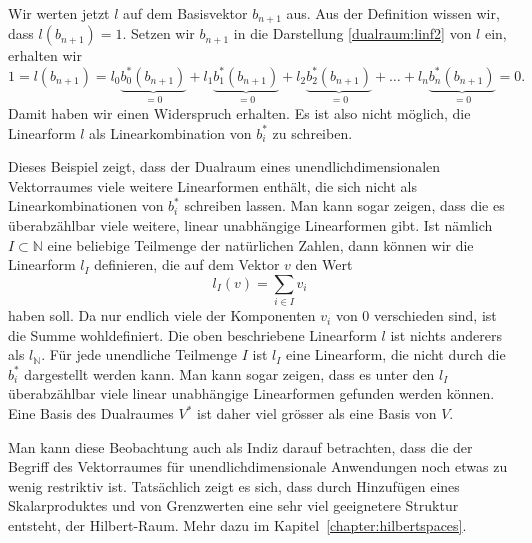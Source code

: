 Wir werten jetzt $l$ auf dem Basisvektor $b_{n+1}$ aus.
Aus der Definition wissen wir, dass $l(b_{n+1})=1$.
Setzen wir $b_{n+1}$ in die Darstellung 
\eqref{dualraum:linf2} von $l$ ein, erhalten wir
\[
1
=
l(b_{n+1})
=
l_0\underbrace{b_0^*(b_{n+1})}_{\displaystyle=0}
+
l_1\underbrace{b_1^*(b_{n+1})}_{\displaystyle=0}
+
l_2\underbrace{b_2^*(b_{n+1})}_{\displaystyle=0}
+\dots+
l_n\underbrace{b_n^*(b_{n+1})}_{\displaystyle=0}
=
0.
\]
Damit haben wir einen Widerspruch erhalten.
Es ist also nicht möglich, die Linearform $l$ als Linearkombination
von $b_i^*$ zu schreiben.

Dieses Beispiel zeigt, dass der Dualraum eines unendlichdimensionalen
Vektorraumes viele weitere Linearformen enthält, die sich nicht
als Linearkombinationen von $b_i^*$ schreiben lassen.
Man kann sogar zeigen, dass die es überabzählbar viele weitere, linear
unabhängige Linearformen gibt.
Ist nämlich $I\subset\mathbb N$ eine beliebige Teilmenge der natürlichen
Zahlen, dann können wir die Linearform $l_I$ definieren, die auf dem
Vektor $v$ den Wert
\[
l_I(v) = \sum_{i\in I}v_i
\]
haben soll.
Da nur endlich viele der Komponenten $v_i$ von $0$ verschieden sind, 
ist die Summe wohldefiniert.
Die oben beschriebene Linearform $l$ ist nichts anderers als $l_{\mathbb N}$.
Für jede unendliche Teilmenge $I$ ist $l_I$ eine Linearform, die nicht
durch die $b_i^*$ dargestellt werden kann.
Man kann sogar zeigen, dass es unter den $l_I$ überabzählbar viele 
linear unabhängige Linearformen gefunden werden können.
Eine Basis des Dualraumes $V^*$ ist daher viel grösser als eine Basis
von $V$.

Man kann diese Beobachtung auch als Indiz darauf betrachten, dass die
der Begriff des Vektorraumes für unendlichdimensionale Anwendungen noch
etwas zu wenig restriktiv ist.
Tatsächlich zeigt es sich, dass durch Hinzufügen eines Skalarproduktes
und von Grenzwerten eine sehr viel geeignetere Struktur entsteht,
der Hilbert-Raum.
Mehr dazu im Kapitel~\ref{chapter:hilbertspaces}.




